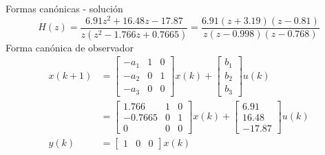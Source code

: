 \documentclass[presentation,aspectratio=1610]{beamer}
\begin{document}
\begin{frame}[label={sec:org971ea4a}]{Formas canónicas - solución}
\[ H(z) = \frac{6.91z^2 + 16.48z -17.87}{z(z^2 - 1.766z + 0.7665)} = \frac{6.91(z+3.19)(z-0.81)}{z(z-0.998)(z-0.768)}\]
Forma canónica de observador
\begin{align*}
 x(k+1) &= \begin{bmatrix} -a_1 & 1 & 0\\-a_2 & 0 & 1\\-a_3 & 0 & 0\end{bmatrix} x(k) + \begin{bmatrix}b_1\\b_2\\b_3\end{bmatrix} u(k) \\
 &= \begin{bmatrix} 1.766 & 1 & 0\\-0.7665 & 0 & 1\\0 & 0 & 0\end{bmatrix} x(k) + \begin{bmatrix}6.91\\16.48\\-17.87\end{bmatrix} u(k) \\
 y(k) &= \begin{bmatrix} 1 & 0 & 0 \end{bmatrix} x(k)
 \end{align*}
\end{frame}
\end{document}
